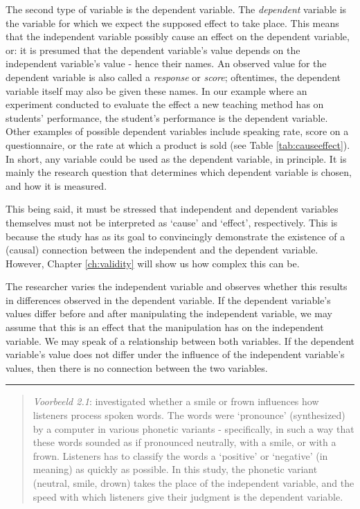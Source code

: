 \documentclass[
]{book}
\begin{document}
The second type of variable is the dependent variable. The \emph{dependent} variable is the variable for which we expect the supposed effect to take place. This means that the independent variable possibly cause an effect on the dependent variable, or: it is presumed that the dependent variable's value depends on the independent variable's value - hence their names. An observed value for the dependent variable is also called a \emph{response} or \emph{score}; oftentimes, the dependent variable itself may also be given these names. In our example where an experiment conducted to evaluate the effect a new teaching method has on students' performance, the student's performance is the dependent variable. Other examples of possible dependent variables include speaking rate, score on a questionnaire, or the rate at which a product is sold (see Table \ref{tab:causeeffect}). In short, any variable could be used as the dependent variable, in principle. It is mainly the research question that determines which dependent variable is chosen, and how it is measured.

This being said, it must be stressed that independent and dependent variables themselves must not be interpreted as `cause' and `effect', respectively. This is because the study has as its goal to convincingly demonstrate the existence of a (causal) connection between the independent and the dependent variable. However, Chapter \ref{ch:validity} will show us how complex this can be.

The researcher varies the independent variable and observes whether this results in differences observed in the dependent variable. If the dependent variable's values differ before and after manipulating the independent variable, we may assume that this is an effect that the manipulation has on the independent variable. We may speak of a relationship between both variables. If the dependent variable's value does not differ under the influence of the independent variable's values, then there is no connection between the two variables.

\begin{center}\rule{0.5\linewidth}{0.5pt}\end{center}

\begin{quote}
\emph{Voorbeeld 2.1}:
\citet{QSF12} investigated whether a smile or frown influences how listeners process spoken words. The words were `pronounce' (synthesized) by a computer in various phonetic variants - specifically, in such a way that these words sounded as if pronounced neutrally, with a smile, or with a frown. Listeners has to classify the words a `positive' or `negative' (in meaning) as quickly as possible. In this study, the phonetic variant (neutral, smile, drown) takes the place of the independent variable, and the speed with which listeners give their judgment is the dependent variable.
\end{quote}
\end{document}
